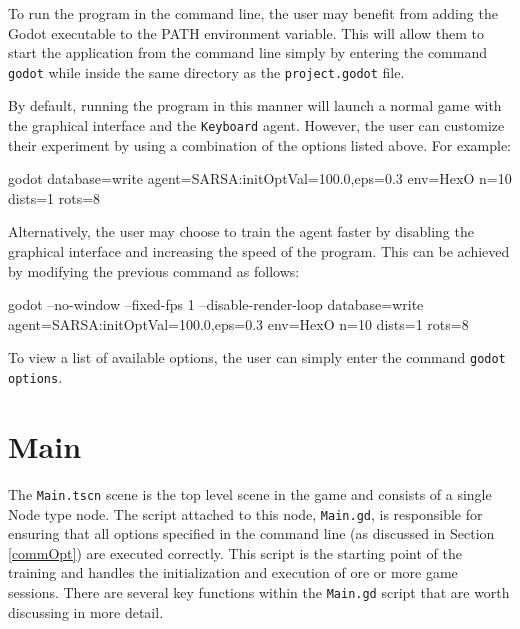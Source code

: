 To run the program in the command line, the user may benefit from adding the Godot executable to the PATH environment variable. This will allow them to start the application from the command line simply by entering the command \texttt{godot} while inside the same directory as the \texttt{project.godot} file.

By default, running the program in this manner will launch a normal game with the graphical interface and the \texttt{Keyboard} agent. However, the user can customize their experiment by using a combination of the options listed above. For example:

\begin{algorithm}
\begin{algorithmic}
\State godot database=write agent=SARSA:initOptVal=100.0,eps=0.3 env=HexO n=10 dists=1 rots=8
\end{algorithmic}
\end{algorithm}

Alternatively, the user may choose to train the agent faster by disabling the graphical interface and increasing the speed of the program. This can be achieved by modifying the previous command as follows:

\begin{algorithm}
\begin{algorithmic}
\State godot --no-window --fixed-fps 1 --disable-render-loop database=write agent=SARSA:initOptVal=100.0,eps=0.3 env=HexO n=10 dists=1 rots=8
\end{algorithmic}
\end{algorithm}

To view a list of available options, the user can simply enter the command \texttt{godot options}.

\section{Main}
The \texttt{Main.tscn} scene is the top level scene in the game and consists of a single Node type node. The script attached to this node, \texttt{Main.gd}, is responsible for ensuring that all options specified in the command line (as discussed in Section \ref{commOpt}) are executed correctly. This script is the starting point of the training and handles the initialization and execution of ore or more game sessions.
There are several key functions within the \texttt{Main.gd} script that are worth discussing in more detail.

